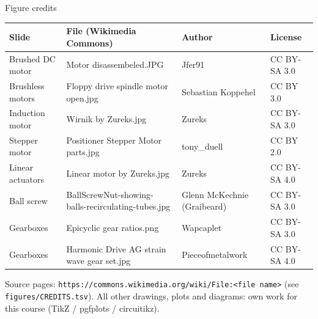 \documentclass[aspectratio=169,10pt]{beamer}
\begin{document}
\begin{frame}{Figure credits}
\scriptsize
\renewcommand{\arraystretch}{1.1}
\begin{tabularx}{\textwidth}{@{}l l X l@{}}
\toprule
\textbf{Slide} & \textbf{File (Wikimedia Commons)} & \textbf{Author} & \textbf{License}\\
\midrule
Brushed DC motor & Motor disassembeled.JPG & Jfer91 & CC BY-SA 3.0\\
Brushless motors & Floppy drive spindle motor open.jpg & Sebastian Koppehel & CC BY 3.0\\
Induction motor & Wirnik by Zureks.jpg & Zureks & CC BY-SA 3.0\\
Stepper motor & Positioner Stepper Motor parts.jpg & tony\_duell & CC BY 2.0\\
Linear actuators & Linear motor by Zureks.jpg & Zureks & CC BY-SA 4.0\\
Ball screw & BallScrewNut-showing-balls-recirculating-tubes.jpg & Glenn McKechnie (Graibeard) & CC BY-SA 3.0\\
Gearboxes & Epicyclic gear ratios.png & Wapcaplet & CC BY-SA 3.0\\
Gearboxes & Harmonic Drive AG strain wave gear set.jpg & Pieceofmetalwork & CC BY-SA 4.0\\
\bottomrule
\end{tabularx}
{\tiny Source pages: \texttt{https://commons.wikimedia.org/wiki/File:<file name>} (see \texttt{figures/CREDITS.tsv}).}
\vspace{2mm}
All other drawings, plots and diagrams: own work for this course (TikZ / pgfplots / circuitikz).
\end{frame}
\end{document}
